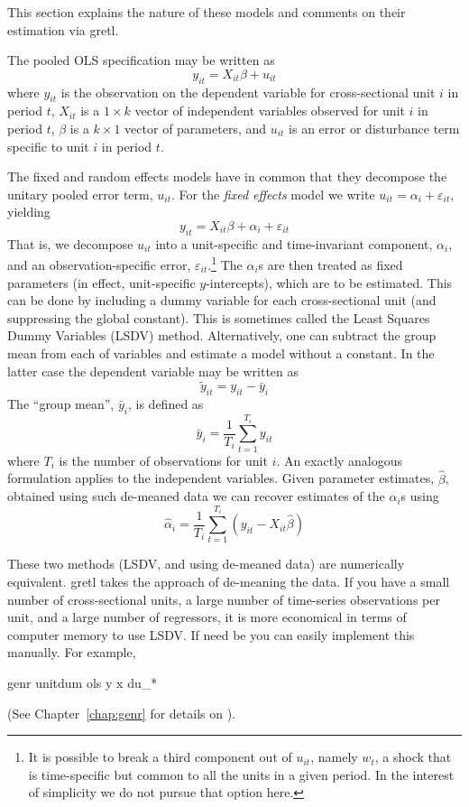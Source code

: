 This section explains the nature of these models and comments on their
estimation via gretl.

The pooled OLS specification may be written as 
\begin{equation}
\label{eq:pooled}
y_{it} = X_{it}\beta + u_{it}
\end{equation}
where $y_{it}$ is the observation on the dependent variable for
cross-sectional unit $i$ in period $t$, $X_{it}$ is a $1\times k$
vector of independent variables observed for unit $i$ in period $t$,
$\beta$ is a $k\times 1$ vector of parameters, and $u_{it}$ is an error
or disturbance term specific to unit $i$ in period $t$.

The fixed and random effects models have in common that they decompose
the unitary pooled error term, $u_{it}$.  For the \textsl{fixed effects}
model we write $u_{it} = \alpha_i + \varepsilon_{it}$, yielding
\begin{equation}
\label{eq:FE}
y_{it} = X_{it}\beta + \alpha_i + \varepsilon_{it}
\end{equation}
That is, we decompose $u_{it}$ into a unit-specific and time-invariant
component, $\alpha_i$, and an observation-specific error,
$\varepsilon_{it}$.\footnote{It is possible to break a third component
  out of $u_{it}$, namely $w_t$, a shock that is time-specific but
  common to all the units in a given period.  In the interest of
  simplicity we do not pursue that option here.}  The $\alpha_i$s are
then treated as fixed parameters (in effect, unit-specific
$y$-intercepts), which are to be estimated.  This can be done by
including a dummy variable for each cross-sectional unit (and
suppressing the global constant).  This is sometimes called the Least
Squares Dummy Variables (LSDV) method.  Alternatively, one can subtract
the group mean from each of variables and estimate a model without a
constant.  In the latter case the dependent variable may be written as
\[
\tilde{y}_{it} = y_{it} - \bar{y}_i
\]
The ``group mean'', $\bar{y}_i$, is defined as
\[
\bar{y}_i = \frac{1}{T_i} \sum_{t=1}^{T_i} y_{it}
\]
where $T_i$ is the number of observations for unit $i$.  An exactly
analogous formulation applies to the independent variables.  Given
parameter estimates, $\hat{\beta}$, obtained using such de-meaned data
we can recover estimates of the $\alpha_i$s using
\[
\hat{\alpha}_i = \frac{1}{T_i} \sum_{t=1}^{T_i} 
   \left(y_{it} - X_{it}\hat{\beta}\right)
\]

These two methods (LSDV, and using de-meaned data) are numerically
equivalent. gretl takes the approach of de-meaning the data.  If
you have a small number of cross-sectional units, a large number of
time-series observations per unit, and a large number of regressors,
it is more economical in terms of computer memory to use LSDV.  If 
need be you can easily implement this manually.  For example,
%
\begin{code}
genr unitdum
ols y x du_*
\end{code}
%
(See Chapter~\ref{chap:genr} for details on ).

